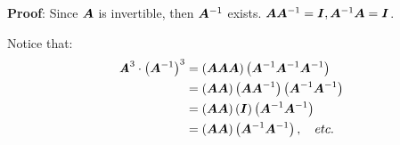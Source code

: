 \documentclass{article}
\begin{document}
\textbf{Proof}: Since $ \matr{A} $ is invertible, then $ \matr{A}^{-1} $ exists. $ \matr{A}\matr{A}^{-1} = \matr{I}, \matr{A}^{-1}\matr{A} = \matr{I} $.

Notice that:
\begin{align*}
	\matr{A}^3 \cdot \left( \matr{A}^{-1} \right)^3 & = \left( \matr{AAA} \right) \left( \matr{A}^{-1}\matr{A}^{-1}\matr{A}^{-1} \right)                          \\
	                                                & = \left( \matr{AA} \right) \left( \matr{A} \matr{A}^{-1} \right) \left( \matr{A}^{-1} \matr{A}^{-1} \right) \\
	                                                & = \left( \matr{AA} \right) \left( \matr{I} \right) \left( \matr{A}^{-1} \matr{A}^{-1} \right)               \\
	                                                & = \left( \matr{AA} \right) \left( \matr{A}^{-1} \matr{A}^{-1} \right), \quad etc.
\end{align*}
\end{document}
